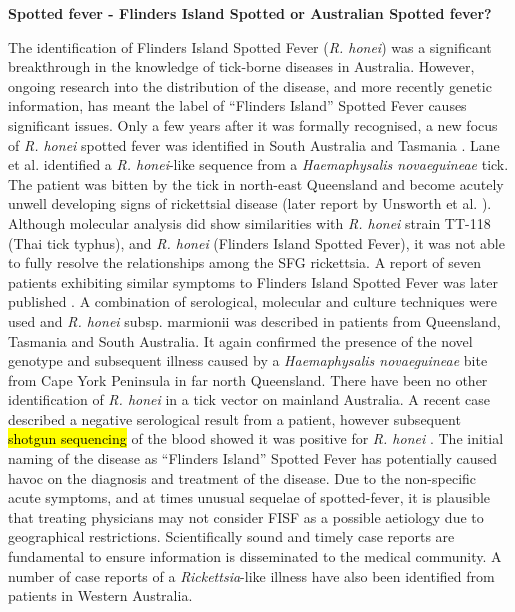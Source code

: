 \documentclass[a4paper, nobind]{templates/ociamthesis}
\begin{document}
\textbf{Spotted fever - Flinders Island Spotted or Australian Spotted fever?}

The identification of Flinders Island Spotted Fever (\emph{R. honei}) was a significant breakthrough in the knowledge of tick-borne diseases in Australia.
However, ongoing research into the distribution of the disease, and more recently genetic information, has meant the label of ``Flinders Island'' Spotted Fever causes significant issues.
Only a few years after it was formally recognised, a new focus of \emph{R. honei} spotted fever was identified in South Australia and Tasmania \autocite{dyerNewFocusRickettsia2005,unsworthNotOnlyFlinders2005}.
Lane et al. \autocite*{laneEvidenceSpottedFeverlike2005a} identified a \emph{R. honei}-like sequence from a \emph{Haemaphysalis novaeguineae} tick.
The patient was bitten by the tick in north-east Queensland and become acutely unwell developing signs of rickettsial disease (later report by Unsworth et al. \autocite*{unsworthThreeRickettsiosesDarnley2007}).
Although molecular analysis did show similarities with \emph{R. honei} strain TT-118 (Thai tick typhus), and \emph{R. honei} (Flinders Island Spotted Fever), it was not able to fully resolve the relationships among the SFG rickettsia.
A report of seven patients exhibiting similar symptoms to Flinders Island Spotted Fever was later published \autocite{unsworthThreeRickettsiosesDarnley2007}.
A combination of serological, molecular and culture techniques were used and \emph{R. honei} subsp. marmionii was described in patients from Queensland, Tasmania and South Australia.
It again confirmed the presence of the novel genotype and subsequent illness caused by a \emph{Haemaphysalis novaeguineae} bite from Cape York Peninsula in far north Queensland.
There have been no other identification of \emph{R. honei} in a tick vector on mainland Australia.
A recent case described a negative serological result from a patient, however subsequent \hl{shotgun sequencing} of the blood showed it was positive for \emph{R. honei} \autocite{grahamDetectionSpottedFever2017}.
The initial naming of the disease as ``Flinders Island'' Spotted Fever has potentially caused havoc on the diagnosis and treatment of the disease.
Due to the non-specific acute symptoms, and at times unusual sequelae of spotted-fever, it is plausible that treating physicians may not consider FISF as a possible aetiology due to geographical restrictions.
Scientifically sound and timely case reports are fundamental to ensure information is disseminated to the medical community.
A number of case reports of a \emph{Rickettsia}-like illness have also been identified from patients in Western Australia.
\end{document}
